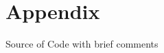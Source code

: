 \documentclass[11pt]{article}
\begin{document}
\newpage









\section{Appendix}

Source of Code with brief comments
\end{document}
